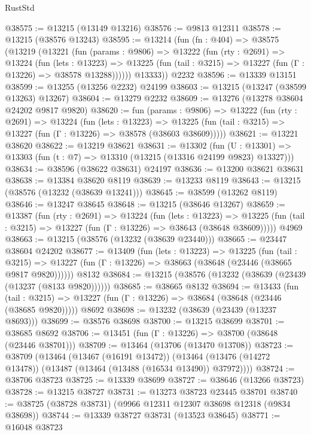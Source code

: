 \begin{lexlean}{RustStd}
\begin{coremodule}
@38575 := @13215 (@13149 @13216)
@38576 := @9813 @12311
@38578 := @13215 (@38576 @13243)
@38595 := @13214
    (fun (fn : @404) =>
    @38575
      (@13219
        (@13221
          (fun (params : @9806) =>
          @13222
            (fun (rty : @2691) =>
            @13224
              (fun (lets : @13223) =>
              @13225 (fun (tail : @3215) => @13227 (fun (Γ : @13226) => @38578 @13288))))))
        @13333))
    @2232
@38596 := @13339 @13151
@38599 := @13255 (@13256 @2232) @24199
@38603 := @13215 (@13247 (@38599 @13263) @13267)
@38604 := @13279 @2232
@38609 := @13276 (@13278 @38604 @24202 @9817 @9820)
@38620 := fun (params : @9806) =>
  @13222
    (fun (rty : @2691) =>
    @13224
      (fun (lets : @13223) =>
      @13225 (fun (tail : @3215) => @13227 (fun (Γ : @13226) => @38578 (@38603 @38609)))))
@38621 := @13221 @38620
@38622 := @13219 @38621
@38631 := @13302
    (fun (U : @13301) => @13303 (fun (t : @7) => @13310 (@13215 (@13316 @24199 @9823) @13327)))
@38634 := @38596 (@38622 @38631) @24197
@38636 := @13200 @38621 @38631
@38638 := @13384 @38620 @8119
@38639 := @13233 @8119
@38643 := @13215 (@38576 (@13232 (@38639 @13241)))
@38645 := @38599 (@13262 @8119)
@38646 := @13247 @38645
@38648 := @13215 (@38646 @13267)
@38659 := @13387
    (fun (rty : @2691) =>
    @13224
      (fun (lets : @13223) =>
      @13225 (fun (tail : @3215) => @13227 (fun (Γ : @13226) => @38643 (@38648 @38609)))))
    @4969
@38663 := @13215 (@38576 (@13232 (@38639 @23440)))
@38665 := @23447 @38604 @24202
@38677 := @13409
    (fun (lets : @13223) =>
    @13225
      (fun (tail : @3215) =>
      @13227 (fun (Γ : @13226) => @38663 (@38648 (@23446 (@38665 @9817 @9820))))))
    @8132
@38684 := @13215 (@38576 (@13232 (@38639 (@23439 (@13237 (@8133 @9820))))))
@38685 := @38665 @8132
@38694 := @13433
    (fun (tail : @3215) => @13227 (fun (Γ : @13226) => @38684 (@38648 (@23446 (@38685 @9820)))))
    @8692
@38698 := @13232 (@38639 (@23439 (@13237 @8693)))
@38699 := @38576 @38698
@38700 := @13215 @38699
@38701 := @38685 @8692
@38706 := @13451 (fun (Γ : @13226) => @38700 (@38648 (@23446 @38701)))
@38709 := @13464 (@13706 (@13470 @13708))
@38723 := @38709
    (@13464
      (@13467 (@16191 @13472))
      (@13464 (@13476 (@14272 @13478)) (@13487 (@13464 (@13488 (@16534 @13490)) @37972))))
@38724 := @38706 @38723
@38725 := @13339 @38699
@38727 := @38646 (@13266 @38723)
@38728 := @13215 @38727
@38731 := @13273 @38723 @23445 @38701
@38740 := @38725 (@38728 @38731) (@9966 @12311 @12307 @38698 @12318 (@9834 @38698))
@38744 := @13339 @38727 @38731 (@13523 @38645)
@38771 := @16048
    @38723

\end{coremodule}
\end{lexlean}
